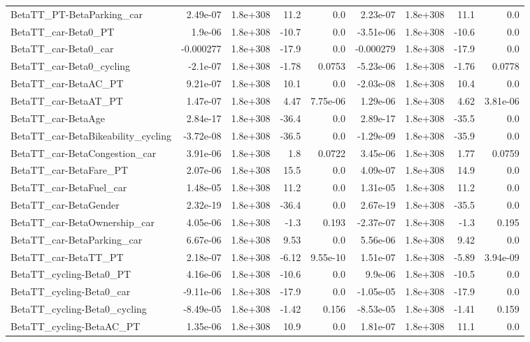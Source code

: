 \begin{tabular}{lrrrrrrrr}
BetaTT_PT-BetaParking_car & 2.49e-07 & 1.8e+308 & 11.2 & 0.0 & 2.23e-07 & 1.8e+308 & 11.1 & 0.0 \\
BetaTT_car-Beta0_PT & 1.9e-06 & 1.8e+308 & -10.7 & 0.0 & -3.51e-06 & 1.8e+308 & -10.6 & 0.0 \\
BetaTT_car-Beta0_car & -0.000277 & 1.8e+308 & -17.9 & 0.0 & -0.000279 & 1.8e+308 & -17.9 & 0.0 \\
BetaTT_car-Beta0_cycling & -2.1e-07 & 1.8e+308 & -1.78 & 0.0753 & -5.23e-06 & 1.8e+308 & -1.76 & 0.0778 \\
BetaTT_car-BetaAC_PT & 9.21e-07 & 1.8e+308 & 10.1 & 0.0 & -2.03e-08 & 1.8e+308 & 10.4 & 0.0 \\
BetaTT_car-BetaAT_PT & 1.47e-07 & 1.8e+308 & 4.47 & 7.75e-06 & 1.29e-06 & 1.8e+308 & 4.62 & 3.81e-06 \\
BetaTT_car-BetaAge & 2.84e-17 & 1.8e+308 & -36.4 & 0.0 & 2.89e-17 & 1.8e+308 & -35.5 & 0.0 \\
BetaTT_car-BetaBikeability_cycling & -3.72e-08 & 1.8e+308 & -36.5 & 0.0 & -1.29e-09 & 1.8e+308 & -35.9 & 0.0 \\
BetaTT_car-BetaCongestion_car & 3.91e-06 & 1.8e+308 & 1.8 & 0.0722 & 3.45e-06 & 1.8e+308 & 1.77 & 0.0759 \\
BetaTT_car-BetaFare_PT & 2.07e-06 & 1.8e+308 & 15.5 & 0.0 & 4.09e-07 & 1.8e+308 & 14.9 & 0.0 \\
BetaTT_car-BetaFuel_car & 1.48e-05 & 1.8e+308 & 11.2 & 0.0 & 1.31e-05 & 1.8e+308 & 11.2 & 0.0 \\
BetaTT_car-BetaGender & 2.32e-19 & 1.8e+308 & -36.4 & 0.0 & 2.67e-19 & 1.8e+308 & -35.5 & 0.0 \\
BetaTT_car-BetaOwnership_car & 4.05e-06 & 1.8e+308 & -1.3 & 0.193 & -2.37e-07 & 1.8e+308 & -1.3 & 0.195 \\
BetaTT_car-BetaParking_car & 6.67e-06 & 1.8e+308 & 9.53 & 0.0 & 5.56e-06 & 1.8e+308 & 9.42 & 0.0 \\
BetaTT_car-BetaTT_PT & 2.18e-07 & 1.8e+308 & -6.12 & 9.55e-10 & 1.51e-07 & 1.8e+308 & -5.89 & 3.94e-09 \\
BetaTT_cycling-Beta0_PT & 4.16e-06 & 1.8e+308 & -10.6 & 0.0 & 9.9e-06 & 1.8e+308 & -10.5 & 0.0 \\
BetaTT_cycling-Beta0_car & -9.11e-06 & 1.8e+308 & -17.9 & 0.0 & -1.05e-05 & 1.8e+308 & -17.9 & 0.0 \\
BetaTT_cycling-Beta0_cycling & -8.49e-05 & 1.8e+308 & -1.42 & 0.156 & -8.53e-05 & 1.8e+308 & -1.41 & 0.159 \\
BetaTT_cycling-BetaAC_PT & 1.35e-06 & 1.8e+308 & 10.9 & 0.0 & 1.81e-07 & 1.8e+308 & 11.1 & 0.0 \\

\end{tabular}
